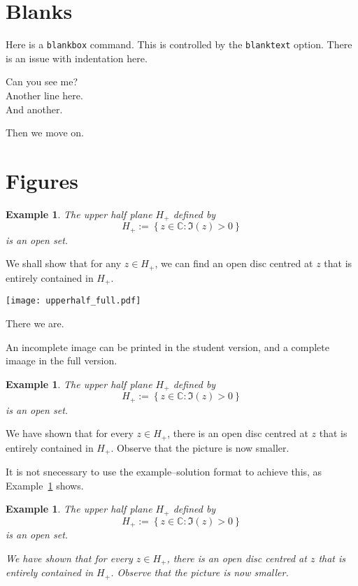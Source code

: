 \documentclass{article}
\theoremstyle{break}
\newcounter{theorem}
\newtheorem{example}[theorem]{Example}
\begin{document}
\section{Blanks}
Here is a {\tt blankbox} command. This is controlled by the {\tt blanktext} option. There is an issue with indentation here.
\begin{blankbox}
Can you see me?\\ Another line here.\\ And another.
\end{blankbox}

Then we move on.

\section{Figures}

\begin{example}
The upper half plane $H_+$ defined by
\[
H_+:= \left\{ z \in \mathbb{C}: \Im (z) > 0\right\}
\]
is an open set.
\end{example}

\begin{solution}
We shall show that for any $z \in H_+$, we can find an open disc centred at $z$ that is entirely contained in $H_+$.
\begin{center}
\texttt{[image: upperhalf\_full.pdf]}
\end{center}
There we are.
\end{solution}

An incomplete image can be printed in the student version, and a complete imaage in the full version.
\begin{example}
\label{e:upperhalfplane2}
The upper half plane $H_+$ defined by
\[
H_+:= \left\{z \in \mathbb{C}: \Im (z) > 0 \right\}
\]
is an open set.
\end{example}
\begin{solution}
\begin{center}
\end{center}
We have shown that for every $z \in H_+$, there is an open disc centred at $z$ that is entirely contained in $H_+$.  Observe that the picture is now smaller.
\end{solution}

It is not snecessary to use the example--solution format to achieve this, as Example~\ref{e:upperhalfplane3} shows.
\begin{example}
\label{e:upperhalfplane3}
The upper half plane $H_+$ defined by
\[
H_+:= \left\{z \in \mathbb{C}: \Im (z) > 0 \right\}
\]
is an open set.
\blankson
\begin{center}
\end{center}
We have shown that for every $z \in H_+$, there is an open disc centred at $z$ that is entirely contained in $H_+$.  Observe that the picture is now smaller.
\blanksoff
\end{example}
\end{document}
